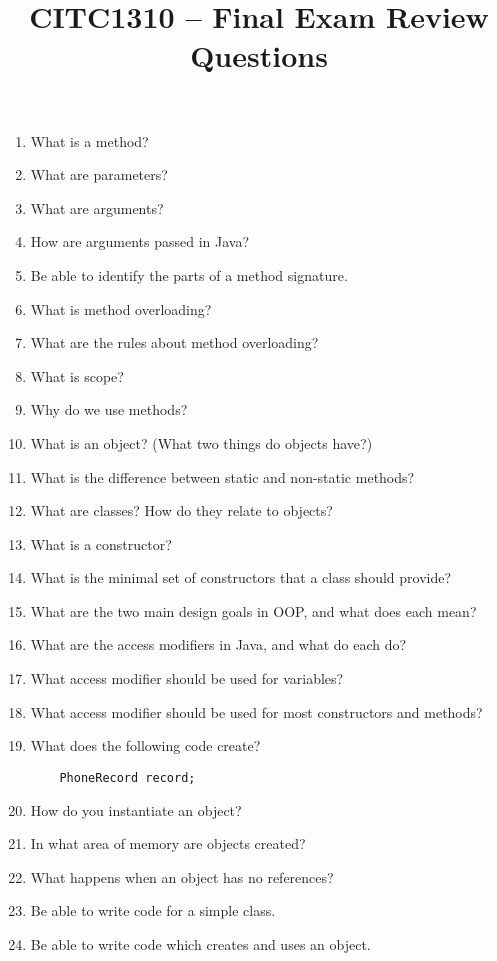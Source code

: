 \documentclass{article}
\title{CITC1310 -- Final Exam Review Questions}
\date{}
\begin{document}
\maketitle

\begin{enumerate}
    \item What is a method?
    \item What are parameters?
    \item What are arguments?
    \item How are arguments passed in Java?
    \item Be able to identify the parts of a method signature.
    \item What is method overloading?
    \item What are the rules about method overloading?
    \item What is scope?
    \item Why do we use methods?
    \item What is an object?  (What two things do objects have?)
    \item What is the difference between static and non-static
        methods?
    \item What are classes? How do they relate to objects?
    \item What is a constructor?
    \item What is the minimal set of constructors that a class should
        provide?
    \item What are the two main design goals in OOP, and what does
        each mean?
    \item What are the access modifiers in Java, and what do each do?
    \item What access modifier should be used for variables?
    \item What access modifier should be used for most constructors
        and methods?
    \item What does the following code create?
    \begin{verbatim}
    PhoneRecord record;
    \end{verbatim}
    \item How do you instantiate an object?
    \item In what area of memory are objects created?
    \item What happens when an object has no references?
    \item Be able to write code for a simple class.
    \item Be able to write code which creates and uses an object.

\end{enumerate}
\end{document}
